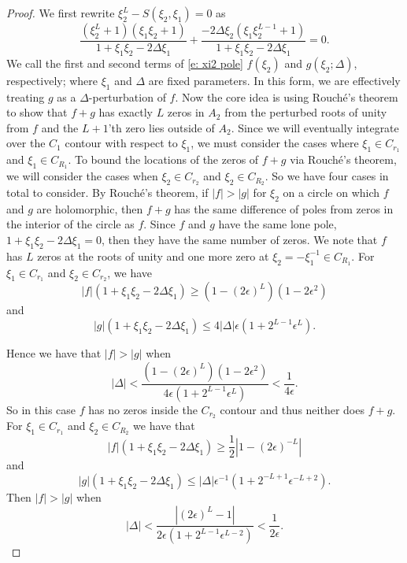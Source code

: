\documentclass[a4paper,11pt]{article}
\theoremstyle{definition}
\begin{document}
\begin{proof}
    We first rewrite $\xi_2^L-S(\xi_2,\xi_1) =0 $ as 
    \begin{equation}\label{e: xi2 pole}
        \frac{\left(\xi_2^L+1 \right)\left(\xi_1\xi_2 +1 \right)}{1+\xi_1\xi_2-2\Delta\xi_1} + \frac{-2 \Delta\xi_2\left( \xi_1 \xi_2^{L-1} + 1\right)}{1+\xi_1\xi_2-2\Delta\xi_1} = 0.
    \end{equation}
    We call the first and second terms of \cref{e: xi2 pole} $f(\xi_2)$ and $g(\xi_2;\Delta)$, respectively; where $
    \xi_1$ and $\Delta$ are fixed parameters. In this form, we are effectively treating $g$ as a $\Delta$-perturbation of $f$. Now the core idea is using Rouch\'e's theorem to show that $f+g$ has exactly $L$ zeros in $A_2$ from the perturbed roots of unity from $f$ and the $L+1$'th zero lies outside of $A_2$. Since we will eventually integrate over the $C_1$ contour with respect to $\xi_1$, we must consider the cases where $\xi_1\in C_{r_1}$ and $\xi_1\in C_{R_1}$. To bound the locations of the zeros of $f+g$ via Rouch\'e's theorem, we will consider the cases when $\xi_2\in C_{r_2}$ and $\xi_2\in C_{R_2}$. So we have four cases in total to consider. By Rouch\'e's theorem, if $|f|>|g|$ for $\xi_2$ on a circle on which $f$ and $g$ are holomorphic, then $f+g$ has the same difference of poles from zeros in the interior of the circle as $f$. Since $f$ and $g$ have the same lone pole, $1+\xi_1\xi_2-2\Delta\xi_1=0$, then they have the same number of zeros. We note that $f$ has $L$ zeros at the roots of unity and one more zero at $\xi_2 = -\xi_1^{-1} \in C_{R_1}$. For $\xi_1\in C_{r_1}$ and $\xi_2\in C_{r_2}$, we have 
    \begin{equation}
        |f|(1+\xi_1\xi_2-2\Delta\xi_1) \geq \left(1-(2\epsilon)^L \right)\left(1-2\epsilon^2 \right)
    \end{equation}
    and 
    \begin{equation}
        |g|(1+\xi_1\xi_2-2\Delta\xi_1) \leq 4|\Delta|\epsilon\left(1+2^{L-1}\epsilon^L\right).
    \end{equation}

Hence we have that $|f|>|g|$ when 
\begin{equation}
    |\Delta| < \frac{\left(1-(2\epsilon)^L \right)\left(1-2\epsilon^2 \right)}{4\epsilon\left(1+2^{L-1}\epsilon^L\right)} < \frac{1}{4\epsilon}.
\end{equation}
 So in this case $f$ has no zeros inside the $C_{r_2}$ contour and thus neither does $f+g$. For $\xi_1\in C_{r_1}$ and $\xi_2\in C_{R_2}$ we have that 
\begin{equation}
    |f|(1+\xi_1\xi_2-2\Delta\xi_1) \geq \frac12\left| 1-(2\epsilon)^{-L} \right|
\end{equation}
and  
\begin{equation}
    |g|(1+\xi_1\xi_2-2\Delta\xi_1) \leq |\Delta|\epsilon^{-1}\left(1+2^{-L+1}\epsilon^{-L+2} \right). 
\end{equation}
Then $|f|>|g|$ when 
\begin{equation}
    |\Delta| < \frac{\left| (2\epsilon)^L-1 \right|}{2\epsilon\left(1+2^{L-1}\epsilon^{L-2} \right)} < \frac{1}{2\epsilon}.
\end{equation}


\end{proof}
\end{document}
